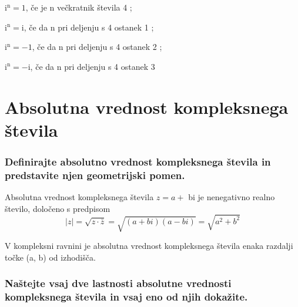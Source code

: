 \documentclass{article}
\begin{document}
$\mathrm{i}^{\mathrm{n}}=1$, če je $\mathrm{n}$ večkratnik števila 4 ;

$\mathrm{i}^{\mathrm{n}}=\mathrm{i}$, če da n pri deljenju s 4 ostanek 1 ;

$\mathrm{i}^{\mathrm{n}}=-1$, če da $\mathrm{n}$ pri deljenju s 4 ostanek 2 ;

$\mathrm{i}^{\mathrm{n}}=-\mathrm{i}$, če da $\mathrm{n}$ pri deljenju s 4 ostanek 3

\section{Absolutna vrednost kompleksnega števila}
\subsubsection*{Definirajte absolutno vrednost kompleksnega števila in predstavite njen geometrijski pomen.}
Absolutna vrednost kompleksnega števila $z=a+$ bi je nenegativno realno število, določeno s predpisom
\begin{equation*}
    |z|=\sqrt{z \cdot \bar{z}}=\sqrt{(a+b i)(a-b i)}=\sqrt{a^{2}+b^{2}}
\end{equation*}

V kompleksni ravnini je absolutna vrednost kompleksnega števila enaka razdalji točke (a, b) od izhodišča.

\begin{center}
\end{center}

\subsubsection*{Naštejte vsaj dve lastnosti absolutne vrednosti kompleksnega števila in vsaj eno od njih dokažite.}
\end{document}
